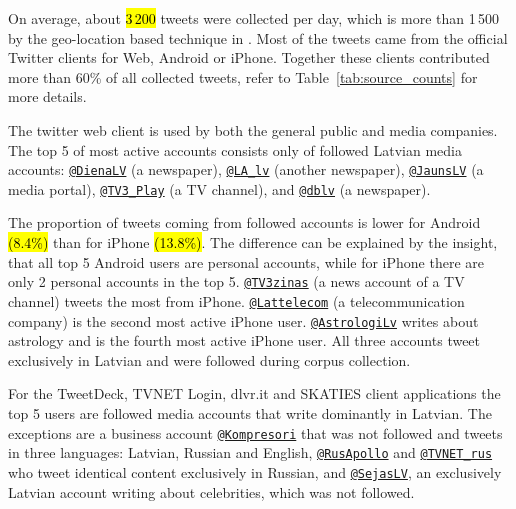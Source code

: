 \documentclass{IOS-Book-Article}
\makeatletter
\newcommand{\sn}[1]{\href{https://twitter.com/#1}{\texttt{@#1}}}
\makeatother
\begin{document}


On average, about \hl{3\,200} tweets were collected per day, which is more than 1\,500 by the geo-location based technique in \cite{milajevs:2017:BUCC}. Most of the tweets came from the official Twitter clients for Web, Android or iPhone. Together these clients contributed more than 60\% of all collected tweets, refer to Table~\ref{tab:source_counts} for more details.

The twitter web client is used by both the general public and media companies. The top 5 of most active accounts consists only of followed Latvian media accounts: \sn{DienaLV} (a newspaper), \sn{LA\_lv} (another newspaper), \sn{JaunsLV} (a media portal), \sn{TV3\_Play} (a TV channel), and \sn{dblv} (a newspaper).

The proportion of tweets coming from followed accounts is lower for Android \hl{(8.4\%)} than for iPhone \hl{(13.8\%)}. The difference can be explained by the insight, that all top 5 Android users are personal accounts, while for iPhone there are only 2 personal accounts in the top 5. \sn{TV3zinas} (a news account of a TV channel) tweets the most from iPhone. \sn{Lattelecom} (a telecommunication company) is the second most active iPhone user. \sn{AstrologiLv} writes about astrology and is the fourth most active iPhone user. All three accounts tweet exclusively in Latvian and were followed during corpus collection.

For the TweetDeck, TVNET Login, dlvr.it and SKATIES client applications the top 5 users are followed media accounts that write dominantly in Latvian. The exceptions are a business account \sn{Kompresori} that was not followed and tweets in three languages: Latvian, Russian and English, \sn{RusApollo} and \sn{TVNET\_rus} who tweet identical content exclusively in Russian, and \sn{SejasLV}, an exclusively Latvian account writing about celebrities, which was not followed.

\end{document}
